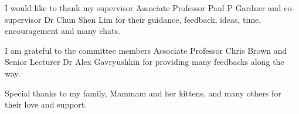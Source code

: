 \begin{acknowledgements}
I would like to thank my supervisor Associate Professor Paul P Gardner and  co-supervisor Dr Chun Shen Lim for their guidance, feedback, ideas, time, encouragement and many chats. 

I am grateful to the committee members Associate Professor Chris Brown and Senior Lecturer Dr Alex Gavryushkin for providing many feedbacks along the way. 


Special thanks to my family, Mammam and her kittens, and many others for their love and support.

\end{acknowledgements}